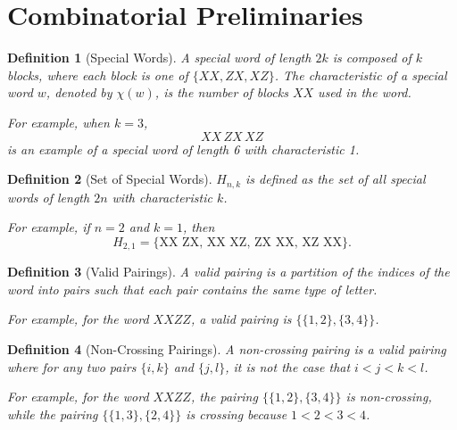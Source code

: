 \documentclass{article}
\newcommand{\Eta}{H}
\newtheorem{definition}{Definition}
\begin{document}
\section{Combinatorial Preliminaries}

\begin{definition}[Special Words]
A \textit{special word} of length \(2k\) is composed of \(k\) blocks, where each block is one of \(\{XX, ZX, XZ\}\). The characteristic of a special word \(w\), denoted by \(\chi(w)\), is the number of blocks \(XX\) used in the word.

For example, when \(k = 3\),
\[
XX \, ZX \, XZ
\]
is an example of a special word of length 6 with characteristic 1.
\end{definition}

\begin{definition}[Set of Special Words]
\(\Eta_{n, k}\) is defined as the set of all special words of length \(2n\) with characteristic \(k\).

For example, if \(n = 2\) and \(k = 1\), then
\[
\Eta_{2, 1} = \{\text{XX ZX}, \, \text{XX XZ}, \, \text{ZX XX}, \, \text{XZ XX}\}.
\]
\end{definition}

\begin{definition}[Valid Pairings]
A \textit{valid pairing} is a partition of the indices of the word into pairs such that each pair contains the same type of letter.

For example, for the word \(XXZZ\), a valid pairing is \(\{\{1, 2\}, \{3, 4\}\}\).
\end{definition}

\begin{definition}[Non-Crossing Pairings]
A \textit{non-crossing pairing} is a valid pairing where for any two pairs \(\{i, k\}\) and \(\{j, l\}\), it is not the case that \(i < j < k < l\).

For example, for the word \(XXZZ\), the pairing \(\{\{1, 2\}, \{3, 4\}\}\) is non-crossing, while the pairing \(\{\{1, 3\}, \{2, 4\}\}\) is crossing because \(1 < 2 < 3 < 4\).
\end{definition}
\end{document}
